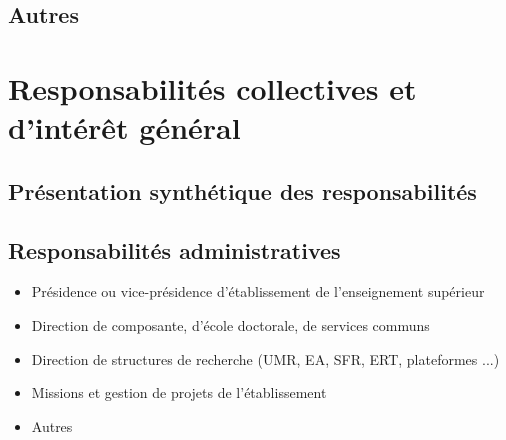 \documentclass[a4paper,12pt]{article}
\newcommand{\ligneSeparatrice}{\noindent{\color{black!40}\rule{\textwidth}{2pt}}}
\newcommand{\instructions}[1]{{\color{black}#1}}
\begin{document}
\subsection{Autres}


\ligneSeparatrice{}


\section{Responsabilités collectives et d'intérêt général}



\subsection{Présentation synthétique des responsabilités}


\subsection{Responsabilités administratives}


\instructions{%
	{\em
	\begin{itemize}
		\item Présidence ou vice-présidence d'établissement de l'enseignement supérieur
    	\item Direction de composante, d'école doctorale, de services communs
    	\item Direction de structures de recherche (UMR, EA, SFR, ERT, plateformes ...)
    	\item Missions et gestion de projets de l'établissement
    	\item Autres
	\end{itemize}

	}
}


\end{document}
